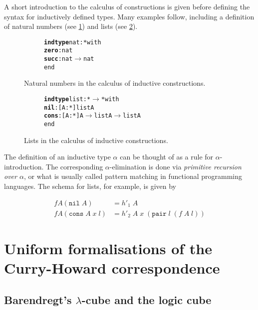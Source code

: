 \documentclass[12pt,toc=bibliography,numbers=noendperiod,
               footnotes=multiple,twoside]{scrartcl}
\begin{document}
A short introduction to the calculus of constructions is given before defining the syntax for inductively defined types. Many examples follow, including a definition of natural numbers (see \cref{fig:nat-inductive-type}) and lists (see \cref{fig:list-inductive-type}).

\begin{figure}[h]
\centering
\begin{subfigure}[t]{0.3\linewidth}
\begin{alltt}
\textbf{indtype} nat : * with
    \textbf{zero} : nat
    \textbf{succ} : nat \(\rightarrow\) nat
end
\end{alltt}
\end{subfigure}
\caption{Natural numbers in the calculus of inductive constructions.}
\label{fig:nat-inductive-type}
\end{figure}

\begin{figure}[h]
\centering
\begin{subfigure}[t]{0.4\linewidth}
\begin{alltt}
\textbf{indtype} list : * \(\rightarrow\) * with
    \textbf{nil}  : [A : *] list A
    \textbf{cons} : [A : *] A \(\rightarrow\) list A \(\rightarrow\) list A
end
\end{alltt}
\end{subfigure}
\caption{Lists in the calculus of inductive constructions.}
\label{fig:list-inductive-type}
\end{figure}

The definition of an inductive type \(\alpha\) can be thought of as a rule for \(\alpha\)-introduction. The corresponding \(\alpha\)-elimination is done via \emph{primitive recursion over \(\alpha\)}, or what is usually called pattern matching in functional programming languages. The schema for lists, for example, is given by

\begin{align*}
f A (\texttt{nil}\;A) &= h'_1\;A \\
f A (\texttt{cons}\;A\;x\;l) &= h'_2\;A\;x\;(\texttt{pair}\;l\;(f\;A\;l))
\end{align*}


\section{Uniform formalisations of the Curry-Howard correspondence}

\subsection{Barendregt's \(\lambda\)-cube and the logic cube}
\end{document}
